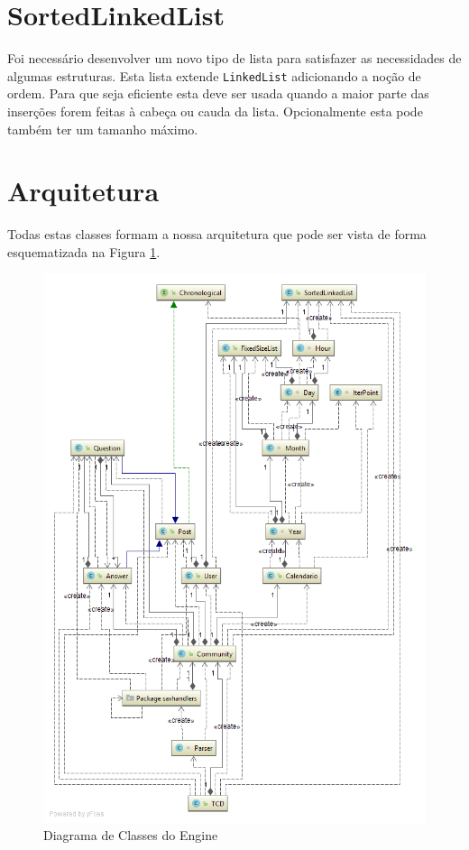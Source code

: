 \documentclass[10pt,a4paper]{report}
\begin{document}
    \section{SortedLinkedList}
    Foi necessário desenvolver um novo tipo de lista para satisfazer as
    necessidades de algumas estruturas.
    Esta lista extende \texttt{LinkedList} adicionando a noção de
    ordem. Para que seja eficiente esta deve ser usada quando a maior parte
    das inserções forem feitas à cabeça ou cauda da lista. Opcionalmente
    esta pode também ter um tamanho máximo.

    \section{Arquitetura}
    Todas estas classes formam a nossa arquitetura que pode ser vista de forma
    esquematizada na Figura \ref{fig:fulldiagram}.

    \begin{figure}[h]
        \centering
        \includegraphics[width=\textwidth]{./images/FullDiagram.png}
        \caption{Diagrama de Classes do Engine}
        \label{fig:fulldiagram}
    \end{figure}
\end{document}
